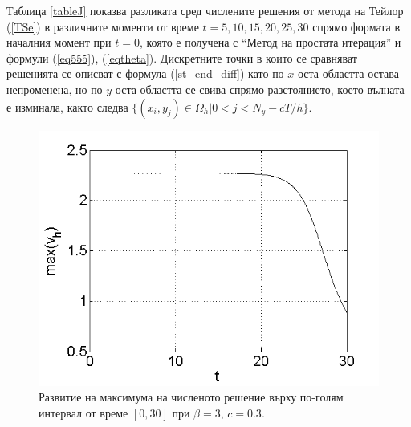 \documentclass{article}
\newcommand{\rf}[1]{(\ref{#1})}
\theoremstyle{remark}
\begin{document}
Таблица \ref{tableJ} показва разликата сред числените решения от метода на Тейлор \rf{TSe} в различните моменти от време $t=5,10,15,20,25,30$ спрямо формата в началния момент при $t=0$, която е получена с ``Метод на простата итерация'' и формули \rf{eq555}, \rf{eqtheta}. Дискретните точки в които се сравняват решенията се описват с формула \rf{st_end_diff} като по $x$ оста областта остава непроменена, но по $y$ оста областта се свива спрямо разстоянието, което вълната е изминала, както следва $\{(x_i, y_j) \in \Omega_h |0 < j < N_y - cT/h\}$.

\begin{figure}\vspace{0.2cm}
	\includegraphics[width=\linewidth]{SolutionView/maximum_50_bt3_c030_h005.png}
\caption{Развитие на максимума на численото решение върху по-голям интервал от време $[0, 30]$ при $\beta = 3$, $c=0.3$.}
\label{Maximum2}
\end{figure}
\FloatBarrier
\end{document}
